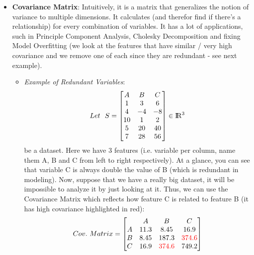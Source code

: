 \documentclass[11pt, twocolumn]{article}
\begin{document}
\begin{itemize}
\item \textbf{Covariance Matrix}:
Intuitively, it is a matrix that generalizes the notion of variance to multiple dimensions. It calculates (and therefor find if there's a relationship) for every combination of variables.
It has a lot of applications, such in Principle Component Analysis, Cholesky Decomposition and fixing Model Overfitting (we look at the features that have similar / very high covariance and we remove one of each since they are redundant - see next example).
\begin{itemize}
\item \textit{Example of Redundant Variables}:
\[ Let ~~ S =
\begin{bmatrix}
	A & B & C\\
    1 & 3 & 6 \\
    4 & -4 & -8 \\
    10 & 1 & 2\\
    5 & 20 & 40\\
    7 & 28 & 56\\
\end{bmatrix} \in \rm I\!R^3
\]
be a dataset. Here we have 3 features (i.e. variable per column, name them A, B and C from left to right respectively). At a glance, you can see that variable C is always double the value of B (which is redundant in modeling). Now, suppose that we have a really big dataset, it will be impossible to analyze it by just looking at it. Thus, we can use the Covariance Matrix which reflects how feature C is related to feature B (it has high covariance highlighted in red):
\[ Cov. ~ Matrix =
\begin{bmatrix}
	& A & B & C\\
    A & 11.3 & 8.45 & 16.9 \\
    B & 8.45 & 187.3 & {\color{red} 374.6} \\
    C & 16.9 & {\color{red} 374.6} & 749.2\\
\end{bmatrix}
\]
\end{itemize}
\end{itemize}
\end{document}

